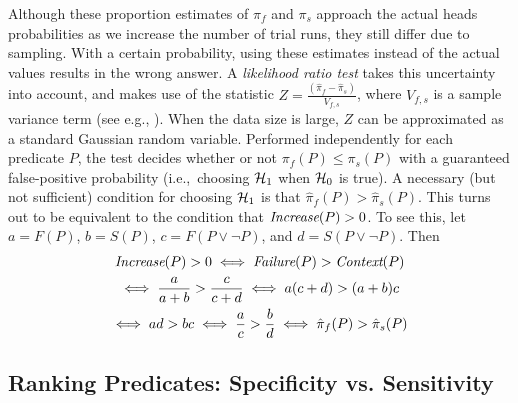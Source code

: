 Although these proportion estimates of $\pi_f$ and $\pi_s$ approach the
actual heads probabilities as we increase the number of trial runs, they
still differ due to sampling.  With a certain probability, using these
estimates instead of the actual values results in the wrong
answer.  A \textit{likelihood ratio test} takes this uncertainty into
account, and makes use of the statistic $ Z = \frac{(\hat \pi_f - \hat
  \pi_s)}{V_{f,s}}$, where $V_{f,s}$ is a sample variance term (see
e.g., \cite{Lehmann:1986:hyptest}).  When
the data size is large, $Z$ can be approximated as a standard Gaussian
random variable.  Performed independently for each predicate $P$, the
test decides whether or not $\pi_f(P) \leq \pi_s(P)$ with a guaranteed
false-positive probability (i.e.,\ choosing ${\mathcal{H}}_1$ when ${\mathcal{H}}_0$ is true).
A necessary (but not sufficient) condition for choosing ${\mathcal{H}}_1$ is that
$\hat \pi_f(P) > \hat \pi_s(P)$.  This turns out to be
equivalent to the condition that $\textit{Increase}(P) > 0$.  To see this,
let $a = F(P)$, $b = S(P)$, $c = F(P\lor\lnot P)$, and $d = S(P\lor\lnot P)$.
Then
\begin{gather*}
  \textit{Increase}(P) > 0 \iff \textit{Failure}(P) > \textit{Context}(P) \\
  \iff \frac{a}{a+b} > \frac{c}{c+d}
  \iff a (c+d) > (a+b) c \\
  \iff ad > bc \iff \frac{a}{c} > \frac{b}{d}
  \iff \hat \pi_f(P) > \hat \pi_s(P)
\end{gather*}



\subsection{Ranking Predicates: Specificity vs. Sensitivity}
\label{sec:ranking}


